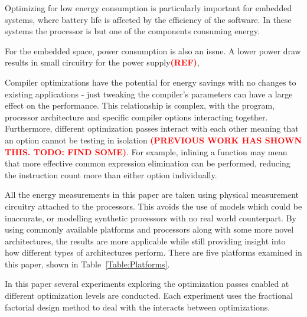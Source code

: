 \documentclass[twocolumn]{article}
\newcommand{\todo}[1]{\textbf{\textcolor{red}{#1}}}
\begin{document}
Optimizing for low energy consumption is particularly important for embedded systems, where battery life is affected by the efficiency of the software. In these systems the processor is but one of the components consuming energy.

For the embedded space, power consumption is also an issue. A lower power draw results in small circuitry for the power supply\todo{(REF)},

Compiler optimizations have the potential for energy savings with no changes to existing applications - just tweaking the compiler's parameters can have a large effect on the performance. This relationship is complex, with the program, processor architecture and specific compiler options interacting together. Furthermore, different optimization passes interact with each other meaning that an option cannot be testing in isolation \todo{(PREVIOUS WORK HAS SHOWN THIS. TODO: FIND SOME)}. For example, inlining a function may mean that more effective common expression elimination can be performed, reducing the instruction count more than either option individually.

All the energy measurements in this paper are taken using physical measurement circuitry attached to the processors. This avoids the use of models which could be inaccurate, or modelling synthetic processors with no real world counterpart. By using commonly available platforms and processors along with some more novel architectures, the results are more applicable while still providing insight into how different types of architectures perform. There are five platforms examined in this paper, shown in Table~\ref{Table:Platforms}.



In this paper several experiments exploring the optimization passes enabled at different optimization levels are conducted. Each experiment uses the fractional factorial design method to deal with the interacts between optimizations.
\end{document}
